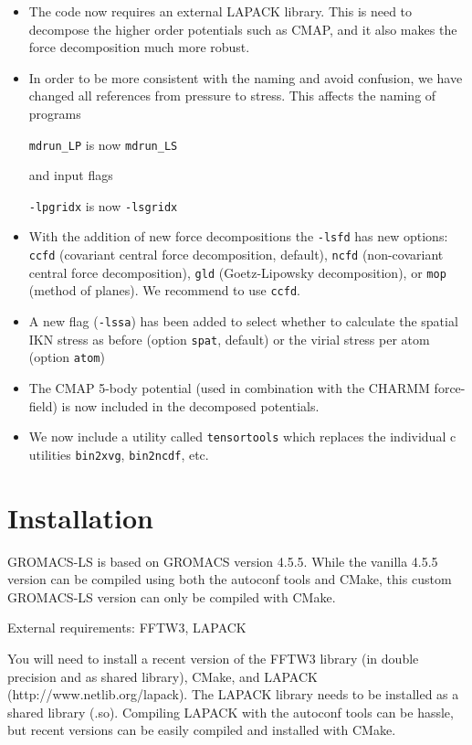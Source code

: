 \documentclass[10pt,letterpaper,notitlepage]{article}
\begin{document}
\begin{itemize}
	\item The code now requires an external LAPACK library. This is need to decompose the higher order potentials such as CMAP, and it also makes the force decomposition much more robust.
	\item In order to be more consistent with the naming and avoid confusion, we have changed all references from pressure to stress. This affects the naming of programs
	
	\texttt{mdrun\_LP} is now \texttt{mdrun\_LS}
	
	and input flags
	
	\texttt{-lpgridx} is now \texttt{-lsgridx}
	
	\item With the addition of new force decompositions the \texttt{-lsfd} has new options: \texttt{ccfd} (covariant central force decomposition, default), \texttt{ncfd} (non-covariant central force decomposition), \texttt{gld} (Goetz-Lipowsky decomposition), or \texttt{mop} (method of planes). We recommend to use \texttt{ccfd}.
	\item A new flag (\texttt{-lssa}) has been added to select whether to calculate the spatial IKN stress as before (option \texttt{spat}, default) or the virial stress per atom (option \texttt{atom})
	\item The CMAP 5-body potential (used in combination with the CHARMM force-field) is now included in the decomposed potentials.
	\item We now include a utility called \texttt{tensortools} which replaces the individual c utilities \texttt{bin2xvg}, \texttt{bin2ncdf}, etc.
\end{itemize}

\section{Installation}
GROMACS-LS is based on GROMACS version 4.5.5. While the vanilla 4.5.5 version can be compiled using both the autoconf tools and CMake, this custom GROMACS-LS version can only be compiled with CMake.

External requirements: FFTW3, LAPACK

You will need to install a recent version of the FFTW3 library (in double precision and as shared library), CMake, and LAPACK (http://www.netlib.org/lapack). The LAPACK library needs to be installed as a shared library (.so). Compiling LAPACK with the autoconf tools can be hassle, but recent versions can be easily compiled and installed with CMake.
\end{document}

